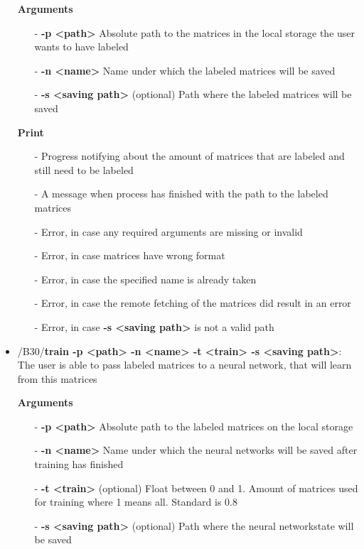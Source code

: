 \documentclass[parskip=full]{scrartcl}
\begin{document}
\begin{itemize}
\textbf{Arguments}
	\begin{itemize}
	\item[-]\textbf{-p <path>} Absolute path to the matrices in the local storage the user wants to have labeled
	\item[-]\textbf{-n <name>} Name under which the labeled matrices will be saved
	\item[-]\textbf{-s <saving path>} (optional) Path where the labeled matrices will be saved
	\end{itemize}

\textbf{Print}
	\begin{itemize}
	\item[-]Progress notifying about the amount of matrices that are labeled and still need to be labeled
	\item[-]A message when process has finished with the path to the labeled matrices
	\item[-]Error, in case any required arguments are missing or invalid
	\item[-]Error, in case matrices have wrong format
	\item[-]Error, in case the specified name is already taken
	\item[-]Error, in case the remote fetching of the matrices did result in an error
	\item[-]Error, in case \textbf{-s <saving path>} is not a valid path
	\end{itemize}

\item/B30/\textbf{train -p <path> -n <name> -t <train> -s <saving path>}:
\newline The user is able to pass labeled matrices to a \gls{neural network}, that will learn from this matrices

\textbf{Arguments}
	\begin{itemize}
	\item[-]\textbf{-p <path>} Absolute path to the labeled matrices on the local storage
	\item[-]\textbf{-n <name>} Name under which the \glspl{neural network} will be saved after training has finished
	\item[-]\textbf{-t <train>} (optional) Float between 0 and 1. Amount of matrices used for training where 1 means all. Standard is 0.8
	\item[-]\textbf{-s <saving path>} (optional) Path where the \gls{neural network}state will be saved
	\end{itemize}


\end{itemize}
\end{document}
